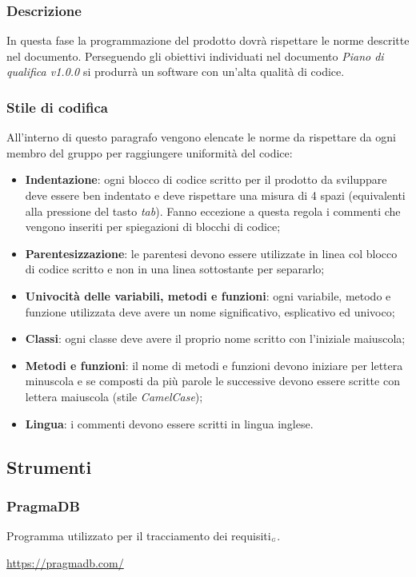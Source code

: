 \subsubsection{Descrizione}\label{ProcessiPrimariCodificaDescrizione}
In questa fase la programmazione del prodotto dovrà rispettare le norme descritte nel documento. Perseguendo gli obiettivi individuati nel documento \textit{Piano di qualifica v1.0.0} si produrrà un software con un'alta qualità di codice.

\subsubsection{Stile di codifica}\label{ProcessiPrimariCodificaStileDiCodifica}
All'interno di questo paragrafo vengono elencate le norme da rispettare da ogni membro del gruppo per raggiungere uniformità del codice:

\begin{itemize}
	\item \textbf{Indentazione}: ogni blocco di codice scritto per il prodotto da sviluppare deve essere ben indentato e deve rispettare una misura di 4 spazi (equivalenti alla pressione del tasto \textit{tab}). Fanno eccezione a questa regola i commenti che vengono inseriti per spiegazioni di blocchi di codice;
	\item \textbf{Parentesizzazione}: le parentesi devono essere utilizzate in linea col blocco di codice scritto e non in una linea sottostante per separarlo;
	\item \textbf{Univocità delle variabili, metodi e funzioni}: ogni variabile, metodo e funzione utilizzata deve avere un nome significativo, esplicativo ed univoco;
	\item \textbf{Classi}: ogni classe deve avere il proprio nome scritto con l'iniziale maiuscola;
	\item \textbf{Metodi e funzioni}: il nome di metodi e funzioni devono iniziare per lettera minuscola e se composti da più parole le successive devono essere scritte con lettera maiuscola (stile \textit{CamelCase});
	\item \textbf{Lingua}: i commenti devono essere scritti in lingua inglese.
\end{itemize}

\subsection{Strumenti}\label{ProcessiPrimariStrumenti}

\subsubsection{PragmaDB}\label{ProcessiPrimariStrumentiPragmaDB}
Programma utilizzato per il tracciamento dei requisiti$_{\scaleto{G}{3pt}}$.
\begin{center}
	\url{https://pragmadb.com/}
\end{center}

